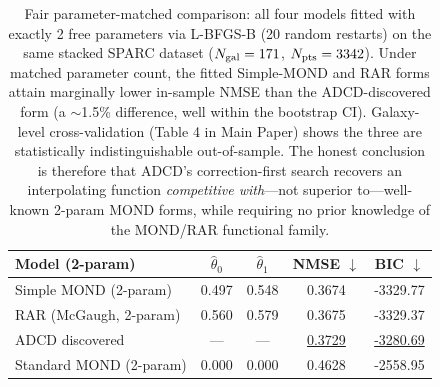 \begin{table}[H]
\centering\footnotesize
\caption{Fair parameter-matched comparison: all four models fitted with
exactly 2 free parameters via L-BFGS-B (20 random restarts) on the same
stacked SPARC dataset ($N_{\rm gal}=171$, $N_{\rm pts}=3342$).
Under matched parameter count, the fitted Simple-MOND and RAR forms attain
marginally lower in-sample NMSE than the ADCD-discovered form (a $\sim$1.5\%
difference, well within the bootstrap CI). Galaxy-level cross-validation
(Table 4 in Main Paper) shows the three are statistically
indistinguishable out-of-sample. The honest conclusion is therefore that
ADCD's correction-first search recovers an interpolating function
\emph{competitive with}—not superior to—well-known 2-param MOND forms, while
requiring no prior knowledge of the MOND/RAR functional family.}
\label{tab:sparc_fitted}
\begin{tabular}{l c c c c}
\toprule
\textbf{Model (2-param)} & $\hat\theta_0$ & $\hat\theta_1$ &
\textbf{NMSE} $\downarrow$ & \textbf{BIC} $\downarrow$ \\
\midrule
  Simple MOND (2-param) & 0.497 & 0.548 & 0.3674 & -3329.77 \\
  RAR (McGaugh, 2-param) & 0.560 & 0.579 & 0.3675 & -3329.37 \\
  ADCD discovered & --- & --- & \underline{0.3729} & \underline{-3280.69} \\
  Standard MOND (2-param) & 0.000 & 0.000 & 0.4628 & -2558.95 \\
\bottomrule
\end{tabular}
\end{table}
